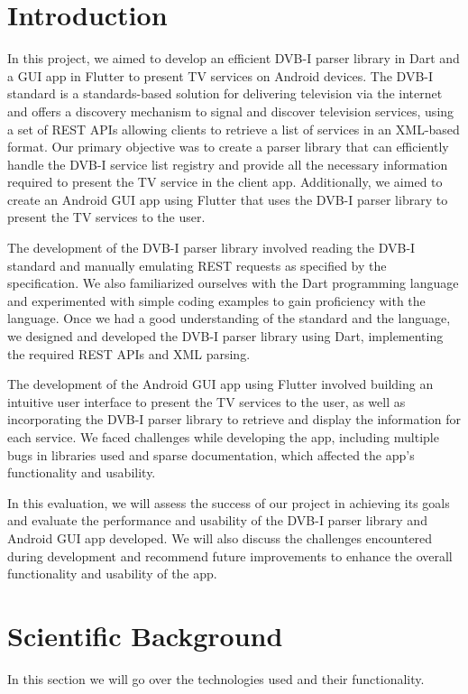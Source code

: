 \documentclass[conference]{IEEEtran}
\begin{document}
\section{Introduction}
In this project, we aimed to develop an efficient DVB-I parser library in Dart and a GUI app in Flutter to present TV services on Android devices. The DVB-I standard is a standards-based solution for delivering television via the internet and offers a discovery mechanism to signal and discover television services, using a set of REST APIs allowing clients to retrieve a list of services in an XML-based format. Our primary objective was to create a parser library that can efficiently handle the DVB-I service list registry and provide all the necessary information required to present the TV service in the client app. Additionally, we aimed to create an Android GUI app using Flutter that uses the DVB-I parser library to present the TV services to the user. 

The development of the DVB-I parser library involved reading the DVB-I standard and manually emulating REST requests as specified by the specification. We also familiarized ourselves with the Dart programming language and experimented with simple coding examples to gain proficiency with the language. Once we had a good understanding of the standard and the language, we designed and developed the DVB-I parser library using Dart, implementing the required REST APIs and XML parsing. 

The development of the Android GUI app using Flutter involved building an intuitive user interface to present the TV services to the user, as well as incorporating the DVB-I parser library to retrieve and display the information for each service. We faced challenges while developing the app, including multiple bugs in libraries used and sparse documentation, which affected the app's functionality and usability.

In this evaluation, we will assess the success of our project in achieving its goals and evaluate the performance and usability of the DVB-I parser library and Android GUI app developed. We will also discuss the challenges encountered during development and recommend future improvements to enhance the overall functionality and usability of the app.

\section{Scientific Background}

In this section we will go over the technologies used and their functionality. 
\end{document}
